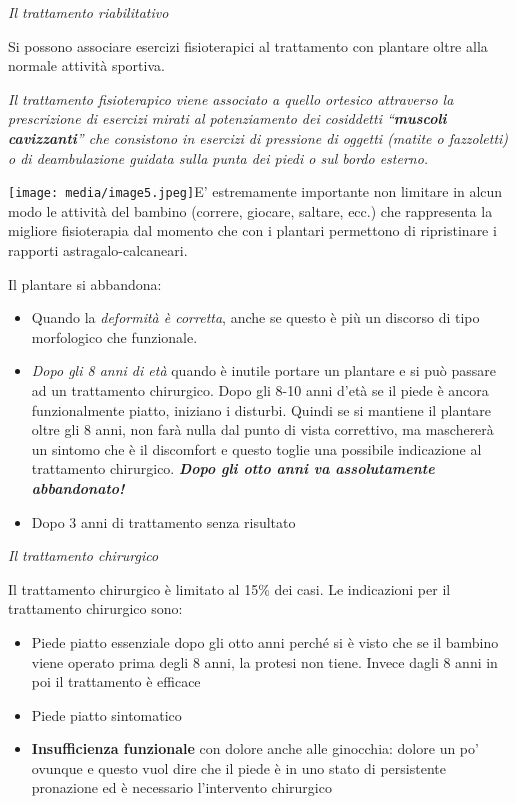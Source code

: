 \documentclass[]{article}
\begin{document}
\emph{Il trattamento riabilitativo}

Si possono associare esercizi fisioterapici al trattamento con plantare
oltre alla normale attività sportiva.

\emph{Il trattamento fisioterapico viene associato a quello ortesico
attraverso la prescrizione di esercizi mirati al potenziamento dei
cosiddetti ``\textbf{muscoli cavizzanti}'' che consistono in esercizi di
pressione di oggetti (matite o fazzoletti) o di deambulazione guidata
sulla punta dei piedi o sul bordo esterno.}

\texttt{[image: media/image5.jpeg]}E'
estremamente importante non limitare in alcun modo le attività del
bambino (correre, giocare, saltare, ecc.) che rappresenta la migliore
fisioterapia dal momento che con i plantari permettono di ripristinare i
rapporti astragalo-calcaneari.

Il plantare si abbandona:

\begin{itemize}
\item
  Quando la \emph{deformità è corretta}, anche se questo è più un
  discorso di tipo morfologico che funzionale.
\item
  \emph{Dopo gli 8 anni di età} quando è inutile portare un plantare e
  si può passare ad un trattamento chirurgico. Dopo gli 8-10 anni d'età
  se il piede è ancora funzionalmente piatto, iniziano i disturbi.
  Quindi se si mantiene il plantare oltre gli 8 anni, non farà nulla dal
  punto di vista correttivo, ma maschererà un sintomo che è il
  discomfort e questo toglie una possibile indicazione al trattamento
  chirurgico. \textbf{\emph{Dopo gli otto anni va assolutamente
  abbandonato!}}
\item
  Dopo 3 anni di trattamento senza risultato
\end{itemize}

\emph{Il trattamento chirurgico}

Il trattamento chirurgico è limitato al 15\% dei casi. Le indicazioni
per il trattamento chirurgico sono:

\begin{itemize}
\item
  Piede piatto essenziale dopo gli otto anni perché si è visto che se il
  bambino viene operato prima degli 8 anni, la protesi non tiene. Invece
  dagli 8 anni in poi il trattamento è efficace
\item
  Piede piatto sintomatico
\item
  \textbf{Insufficienza funzionale} con dolore anche alle ginocchia:
  dolore un po' ovunque e questo vuol dire che il piede è in uno stato
  di persistente pronazione ed è necessario l'intervento chirurgico
\end{itemize}
\end{document}
